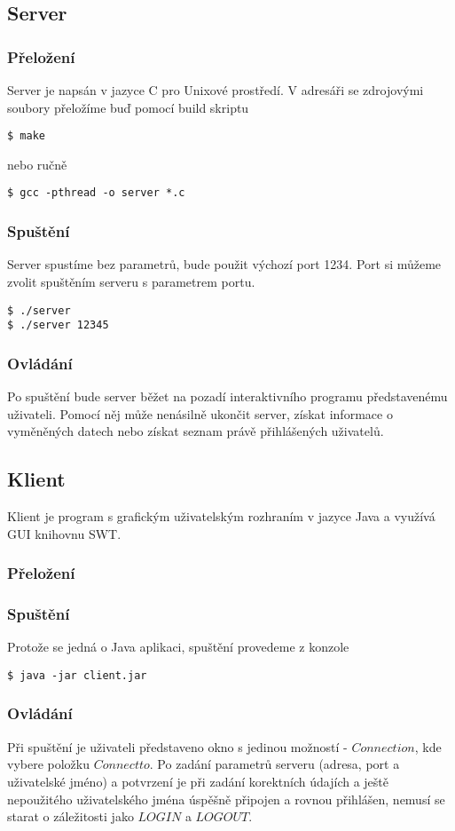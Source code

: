 \documentclass[12pt,titlepage]{article}
\begin{document}
\subsection{Server}
\subsubsection{Přeložení}
Server je napsán v jazyce C pro Unixové prostředí. V adresáři se zdrojovými
soubory přeložíme buď pomocí build skriptu
\begin{verbatim}
$ make
\end{verbatim}

nebo ručně
\begin{verbatim}
$ gcc -pthread -o server *.c
\end{verbatim}

\subsubsection{Spuštění}
Server spustíme bez parametrů, bude použit výchozí port 1234. Port si můžeme zvolit spuštěním serveru s parametrem portu.

\begin{verbatim}
$ ./server
$ ./server 12345
\end{verbatim}

\subsubsection{Ovládání}
Po spuštění bude server běžet na pozadí interaktivního programu představenému
uživateli. Pomocí něj může nenásilně ukončit server, získat informace o
vyměněných datech nebo získat seznam právě přihlášených uživatelů.


\subsection{Klient}
Klient je program s grafickým uživatelským rozhraním v jazyce Java a využívá
GUI knihovnu SWT.
\subsubsection{Přeložení}
\subsubsection{Spuštění}
Protože se jedná o Java aplikaci, spuštění provedeme z konzole 
\begin{verbatim}
$ java -jar client.jar
\end{verbatim}

\subsubsection{Ovládání}
Při spuštění je uživateli představeno okno s jedinou možností - $Connection$,
kde vybere položku $Connect to$. Po zadání parametrů serveru (adresa, port a
uživatelské jméno) a potvrzení je při zadání korektních údajích a ještě
nepoužitého uživatelského jména úspěšně připojen a rovnou přihlášen, nemusí se
starat o záležitosti jako $LOGIN$ a $LOGOUT$.
\end{document}

